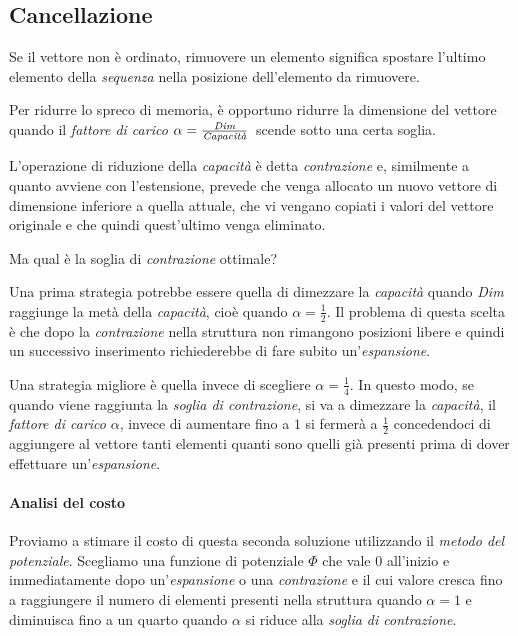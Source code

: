 \subsection{Cancellazione}
Se il vettore non è ordinato, rimuovere un elemento significa spostare l'ultimo
elemento della \emph{sequenza} nella posizione dell'elemento da rimuovere.

Per ridurre lo spreco di memoria, è opportuno ridurre la dimensione del vettore
quando il \emph{fattore di carico} $\alpha=\frac{\emph{Dim}}
{\emph{Capacità}}$\footnotemark\ scende sotto una certa soglia.

L'operazione di riduzione della \emph{capacità} è detta \emph{contrazione} e,
similmente a quanto avviene con l'estensione, prevede che venga allocato un nuovo
vettore di dimensione inferiore a quella attuale, che vi vengano copiati i
valori del vettore originale e che quindi quest'ultimo venga eliminato.

\bigskip\noindent
Ma qual è la soglia di \emph{contrazione} ottimale?

Una prima strategia potrebbe essere quella di dimezzare la \emph{capacità} quando
\emph{Dim} raggiunge la metà della \emph{capacità}, cioè quando $\alpha=
\frac{1}{2}$. Il problema di questa scelta è che dopo la \emph{contrazione}
nella struttura non rimangono posizioni libere e quindi un successivo inserimento
richiederebbe di fare subito un'\emph{espansione}.

Una strategia migliore è quella invece di scegliere $\alpha=\frac{1}{4}$. In
questo modo, se quando viene raggiunta la \emph{soglia di contrazione}, si va
a dimezzare la \emph{capacità}, il \emph{fattore di carico} $\alpha$, invece di
aumentare fino a $1$ si fermerà a $\frac{1}{2}$ concedendoci di aggiungere al
vettore tanti elementi quanti sono quelli già presenti prima di dover effettuare
un'\emph{espansione}.

\paragraph{Analisi del costo}
Proviamo a stimare il costo di questa seconda soluzione utilizzando il
\emph{metodo del potenziale}. Scegliamo una funzione di potenziale $\Phi$ che
vale 0 all'inizio e immediatamente dopo un'\emph{espansione} o una
\emph{contrazione} e il cui valore cresca fino a raggiungere il numero di
elementi presenti nella struttura quando $\alpha=1$ e diminuisca fino a un
quarto quando $\alpha$ si riduce alla \emph{soglia di contrazione}.

